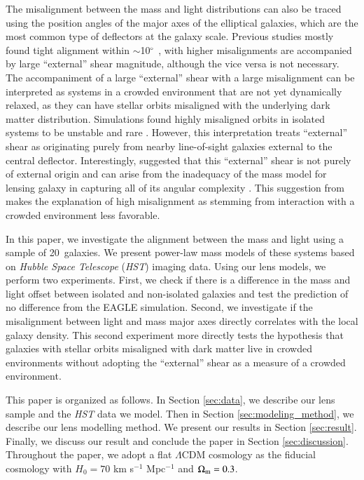 \documentclass{aa}
\newcommand{\nlens}{20}
\begin{document}
The misalignment between the mass and light distributions can also be traced using the position angles of the major axes of the elliptical galaxies, which are the most common type of deflectors at the galaxy scale. Previous studies mostly found tight alignment within $\sim$10$^\circ$ \citep{Keeton98b, Kochanek02, Treu09, Gavazzi12, Sluse12, Bruderer16, Shajib19, Shajib21}, with higher misalignments are accompanied by large ``external'' shear magnitude, although the vice versa is not necessary. The accompaniment of a large ``external'' shear with a large misalignment can be interpreted as systems in a crowded environment that are not yet dynamically relaxed, as they can have stellar orbits misaligned with the underlying dark matter distribution. Simulations found highly misaligned orbits in isolated systems to be unstable and rare \citep{Heiligman79, Martinet88, Adams07, Debattista15}. However, this interpretation treats ``external'' shear as originating purely from nearby line-of-sight galaxies external to the central deflector. Interestingly, \citet{Etherington23} suggested that this ``external'' shear is not purely of external origin and can arise from the inadequacy of the mass model for lensing galaxy in capturing all of its angular complexity \citep[for example, boxy/discyness, ellipticity gradient, isophotal twists;][]{VandeVyvere22, VandeVyvere22b}. This suggestion from \citet{Etherington23} makes the explanation of high misalignment as stemming from interaction with a crowded environment less favorable.

In this paper, we investigate the alignment between the mass and light using a sample of \nlens\  galaxies. We present power-law mass models of these systems based on \textit{Hubble Space Telescope} (\textit{HST}) imaging data. Using our lens models, we perform two experiments. First, we check if there is a difference in the mass and light offset between isolated and non-isolated galaxies and test the prediction of no difference from the EAGLE simulation. Second, we investigate if the misalignment between light and mass major axes directly correlates with the local galaxy density. This second experiment more directly tests the hypothesis that galaxies with stellar orbits misaligned with dark matter live in crowded environments without adopting the ``external'' shear as a measure of a crowded environment.

This paper is organized as follows. In Section \ref{sec:data}, we describe our lens sample and the \textit{HST} data we model. Then in Section \ref{sec:modeling_method}, we describe our lens modelling method. We present our results in Section \ref{sec:result}. Finally, we discuss our result and conclude the paper in Section \ref{sec:discussion}. Throughout the paper, we adopt a flat $\Lambda$CDM cosmology as the fiducial cosmology with $H_0= 70$ km s$^{-1}$ Mpc$^{-1}$ and $\Omega_{\rm m} = 0.3$.
\end{document}

